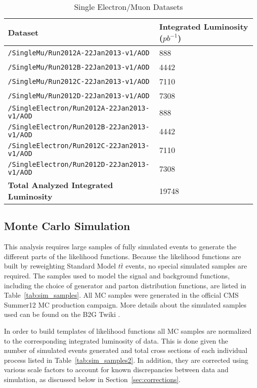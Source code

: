 \documentclass{cmspaperpdf}
\begin{document}
\begin{table}[h!]
\small
\caption{\small Single Electron/Muon Datasets}
\centering
\begin{tabular}{| p{2.55 cm}  p{8.5 cm}  p{3 cm} |}
\hline

\multicolumn{2}{|l}{\textbf{Dataset}} & \textbf{Integrated Luminosity ($\displaystyle{pb^{-1}}$)}\\[0.5ex]
\hline
\multicolumn{2}{|l}{\texttt{/SingleMu/Run2012A-22Jan2013-v1/AOD}} & 888\\
\multicolumn{2}{|l}{\texttt{/SingleMu/Run2012B-22Jan2013-v1/AOD}} & 4442\\
\multicolumn{2}{|l}{\texttt{/SingleMu/Run2012C-22Jan2013-v1/AOD}} & 7110\\
\multicolumn{2}{|l}{\texttt{/SingleMu/Run2012D-22Jan2013-v1/AOD}} & 7308\\
\multicolumn{2}{|l}{\texttt{/SingleElectron/Run2012A-22Jan2013-v1/AOD}} & 888\\
\multicolumn{2}{|l}{\texttt{/SingleElectron/Run2012B-22Jan2013-v1/AOD}} & 4442\\
\multicolumn{2}{|l}{\texttt{/SingleElectron/Run2012C-22Jan2013-v1/AOD}} & 7110\\
\multicolumn{2}{|l}{\texttt{/SingleElectron/Run2012D-22Jan2013-v1/AOD}} & 7308\\

\hline
\multicolumn{2}{|l}{\textbf{Total Analyzed Integrated Luminosity}} & 19748\\
\hline
\end{tabular}
\label{tab:datasets}
\end{table}


\subsection{Monte Carlo Simulation}

This analysis requires large samples of fully simulated events to generate the different parts of the likelihood functions.  Because the likelihood functions are built by reweighting Standard Model $t\bar t$ events, no special simulated samples are required.  The samples used to model the signal and background functions, including the choice of generator and parton distribution functions, are listed in Table~\ref{tab:sim_samples}. All MC samples were generated in the official CMS Summer12 MC production campaign. More details about the simulated samples used can be found on the B2G Twiki \cite{B2G_twiki}.

In order to build templates of likelihood functions all MC samples are normalized to the corresponding integrated luminosity of data. This is done given the number of simulated events generated and total cross sections of each individual process listed in Table~\ref{tab:sim_samples2}. In addition, they are corrected using various scale factors to account for known discrepancies between data and simulation, as discussed below in Section~\ref{sec:corrections}.
\end{document}
